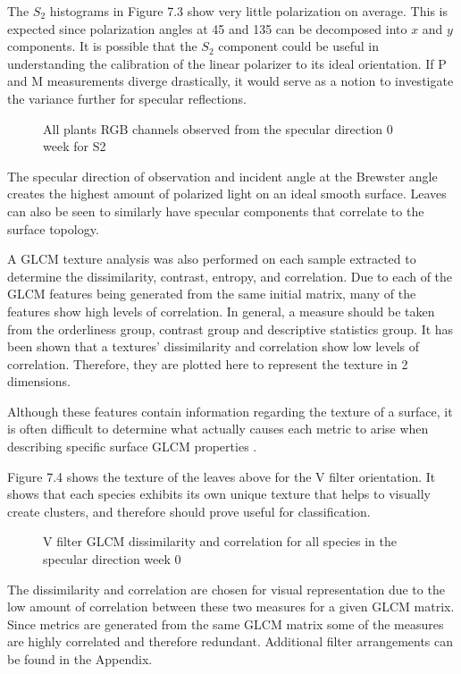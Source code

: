 The $S_2$ histograms in Figure 7.3 show very little polarization on average.  This is expected since polarization angles at 45 and 135 can be decomposed into $x$ and $y$ components.  It is possible that the $S_2$ component could be useful in understanding the calibration of the linear polarizer to its ideal orientation.  If P and M measurements diverge drastically, it would serve as a notion to investigate the variance further for specular reflections.
%
\begin{sidewaysfigure}
    \begin{center}
    \end{center}
    \caption{All plants RGB channels observed from the specular direction 0 week for S2}
    \label{fig:polarization}
\end{sidewaysfigure}
The specular direction of observation and incident angle at the Brewster angle creates the highest amount of polarized light on an ideal smooth surface.  Leaves can also be seen to similarly have specular components that correlate to the surface topology.

A GLCM texture analysis was also performed on each sample extracted to determine the dissimilarity, contrast, entropy, and correlation. Due to each of the GLCM features being generated from the same initial matrix, many of the features show high levels of correlation.  In general, a measure should be taken from the orderliness group, contrast group and descriptive statistics group. It has been shown that a textures' dissimilarity and correlation show low levels of correlation.  Therefore, they are plotted here to represent the texture in 2 dimensions.

Although these features contain information regarding the texture of a surface, it is often difficult to determine what actually causes each metric to arise when describing specific surface GLCM properties \cite{haralick}.

Figure 7.4 shows the texture of the leaves above for the V filter orientation.  It shows that each species exhibits its own unique texture that helps to visually create clusters, and therefore should prove useful for classification.
%
\begin{sidewaysfigure}
    \begin{center}
    \end{center}
    \caption{V filter GLCM dissimilarity and correlation for all species in the specular direction week 0}
    \label{fig:polarization}
\end{sidewaysfigure}
%
The dissimilarity and correlation are chosen for visual representation due to the low amount of correlation between these two measures for a given GLCM matrix.  Since metrics are generated from the same GLCM matrix some of the measures are highly correlated and therefore redundant.
Additional filter arrangements can be found in the Appendix.

